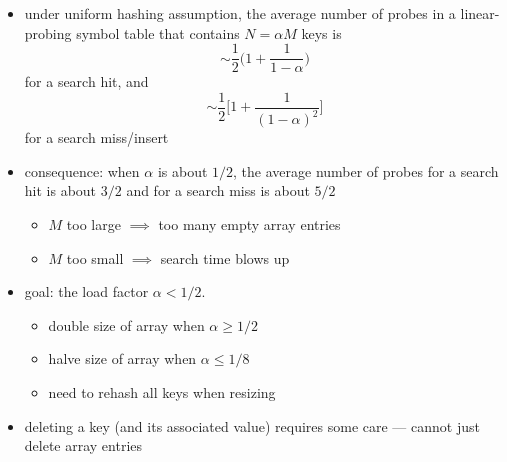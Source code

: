 \documentclass[8pt,a4paper,compress]{beamer}
\begin{document}
\begin{frame}[fragile]
\begin{itemize}
\item under uniform hashing assumption, the average number of probes
in a linear-probing symbol table that contains $N = \alpha M$ keys is $$\sim \frac{1}{2}\Big(1+\frac{1}{1-\alpha}\Big)$$
for a search hit, and $$\sim \frac{1}{2}\Big[1+\frac{1}{(1-\alpha)^2}\Big]$$ for a search miss/insert

\item consequence: when $\alpha$ is about $1/2$, the average number of probes for a search hit is about $3/2$ and for a search miss is about $5/2$
\begin{itemize}
\item $M$ too large $\implies$ too many empty array entries

\item $M$ too small $\implies$ search time blows up
\end{itemize}

\item goal: the load factor $\alpha < 1/2$.
\begin{itemize}
\item double size of array when $\alpha \geq 1/2$

\item halve size of array when $\alpha \leq 1/8$

\item need to rehash all keys when resizing
\end{itemize}

\item deleting a key (and its associated value) requires some care --- cannot just delete array entries
\end{itemize}
\end{frame}
\end{document}
